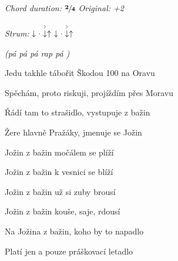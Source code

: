 \begin{song}



\textit{Chord duration: $\mathbf{\sfrac{2}{4}}$} \quad
\textit{Original: +2}

\textit{Strum:} $\Down\Miss\AccentDown\Up\ \Down\Miss\AccentDown\Up$

\large

\begin{chordbox}
\par
{}\par
{}\par
{}\par
{}\par
{}\par
\end{chordbox}

\Large

\bigskip

 \textit{(pá pá pá rap pá )} \par
{}Jedu takhle tábořit Škodou 100 na Oravu \par
{}Spěchám, proto riskuji, projíždím přes Moravu \par
{}Řádí tam to strašidlo, vystupuje z bažin \par
{}Žere hlavně Pražáky, jmenuje se Jožin \par

\bigskip

\begin{chorusbox}
 \par
{}Jožin z bažin močálem se plíží \par
{}Jožin z bažin k vesnici se blíží \par
{}Jožin z bažin už si zuby brousí \par
{}Jožin z bažin kouše, saje, rdousí \par
{}Na Jožina z bažin, koho by to napadlo  \par
{}Platí jen a pouze práškovací letadlo  \par
\end{chorusbox}


\end{song}
